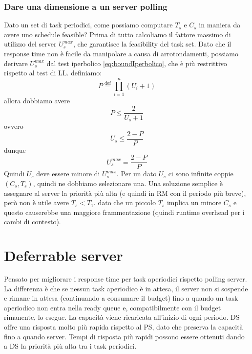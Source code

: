\documentclass[12pt,openany,onesided]{book}
\begin{document}
\subsubsection{Dare una dimensione a un server polling}
Dato un set di task periodici, come possiamo computare $T_s$ e $C_s$ in maniera da avere uno schedule feasible?
Prima di tutto calcoliamo il fattore massimo di utilizzo del server $U_s^{max}$, che garantisce la feasibility del task set.
Dato che il response time non è facile da manipolare a causa di arrotondamenti, possiamo derivare $U_s^{max}$ dal test iperbolico \ref{eq:boundIperbolico}, che è più restrittivo rispetto al test di LL.
definiamo:
\begin{equation}
    P \stackrel{\mathrm{def}}{=} \prod_{i=1}^{n}(U_i+1)
\end{equation}
allora dobbiamo avere 
\begin{equation}
    P \leq \frac{2}{U_s+1}
\end{equation}
ovvero
\begin{equation}
    U_s \leq \frac{2-P}{P}
\end{equation}
dunque 
\begin{equation}
    U_s^{max} = \frac{2-P}{P}
\end{equation}
Quindi $U_s$ deve essere minore di $U_s^{max}$. Per un dato $U_s$ ci sono infinite coppie $(C_s,T_s)$, quindi ne dobbiamo selezionare una.
Una soluzione semplice è assegnare al server la priorità più alta (e quindi in RM con il periodo più breve), però non è utile avere $T_s<T_1$. dato che un piccolo $T_s$ implica un minore $C_s$ e questo causerebbe una maggiore frammentazione (quindi runtime overhead per i cambi di contesto).
\section{Deferrable server}
\label{sec:deferrableServer}
Pensato per migliorare i response time per task aperiodici rispetto polling server.
La differenza è che se nessun task aperiodico è in attesa, il server non si sospende e rimane in attesa (continuando a consumare il budget) fino a quando un task aperiodico non entra nella ready queue e, compatibilmente con il budget rimanente, lo esegue.
La capacità viene ricaricata all'inizio di ogni periodo.
DS offre una risposta molto più rapida rispetto al PS, dato che preserva la capacità fino a quando server.
Tempi di risposta più rapidi possono essere ottenuti dando a DS la priorità più alta tra i task periodici.
\end{document}
